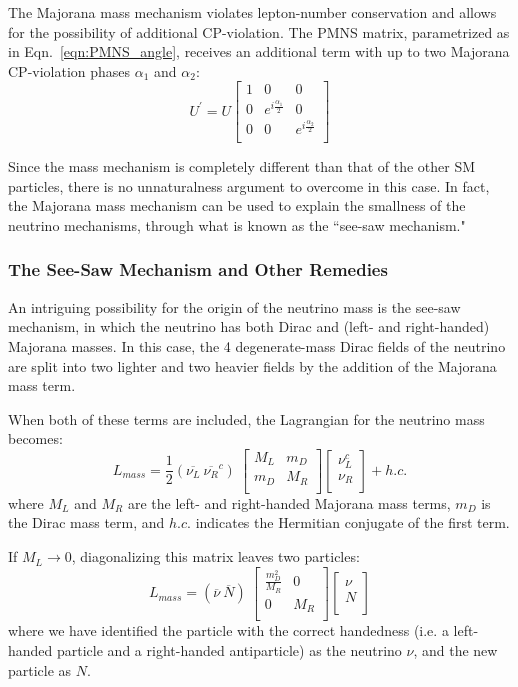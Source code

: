 The Majorana mass mechanism violates lepton-number conservation and allows for the possibility of additional CP-violation. The PMNS matrix, parametrized as in Eqn.~\ref{eqn:PMNS_angle}, receives an additional term with up to two Majorana CP-violation phases $\alpha_1$ and $\alpha_2$:
$$
U^\prime = U 
\begin{bmatrix}
1 & 0 & 0 \\ 
0& e^{i\frac{\alpha_{1}}{2}} & 0 \\ 
0& 0 & e^{i\frac{\alpha_{2}}{2}} \\ 
\end{bmatrix}
$$

Since the mass mechanism is completely different than that of the other SM particles, there is no unnaturalness argument to overcome in this case. In fact, the Majorana mass mechanism can be used to explain the smallness of the neutrino mechanisms, through what is known as the ``see-saw mechanism."

\subsubsection{The See-Saw Mechanism and Other Remedies}
An intriguing possibility for the origin of the neutrino mass is the see-saw mechanism, in which the neutrino has both Dirac and (left- and right-handed) Majorana masses. In this case, the 4 degenerate-mass Dirac fields of the neutrino are split into two lighter and two heavier fields by the addition of the Majorana mass term. 

When both of these terms are included, the Lagrangian for the neutrino mass becomes:
$$ L_{mass} = 
\frac{1}{2} \left(\overline{\nu_L}~\overline{\nu_R}^c\right) \
\begin{bmatrix}
M_L & m_D  \\ 
m_D & M_R  \\ 
\end{bmatrix}
\begin{bmatrix}
\nu_L^c  \\ 
\nu_R   \\ 
\end{bmatrix}
+ h.c.
$$
where $M_L$ and $M_R$ are the left- and right-handed Majorana mass terms, $m_D$ is the Dirac mass term, and $h.c.$ indicates the Hermitian conjugate of the first term.

If $M_L\rightarrow 0$, diagonalizing this matrix leaves two particles:
$$ L_{mass} = 
 \left(\overline{\nu}~\overline{N}\right) \
\begin{bmatrix}
\frac{m_D^2}{M_R} & 0  \\ 
0 & M_R  \\ 
\end{bmatrix}
\begin{bmatrix}
\nu  \\ 
N   \\ 
\end{bmatrix}
$$
where we have identified the particle with the correct handedness (i.e. a left-handed particle and a right-handed antiparticle) as the neutrino $\nu$, and the new particle as $N$. 

